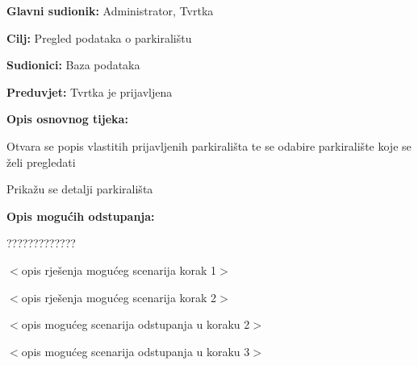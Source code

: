 \noindent {}
\begin{packed_item}
	
	\item \textbf{Glavni sudionik: } Administrator, Tvrtka
	\item  \textbf{Cilj:} Pregled podataka o parkiralištu
	\item  \textbf{Sudionici:} Baza podataka
	\item  \textbf{Preduvjet:} Tvrtka je prijavljena
	\item  \textbf{Opis osnovnog tijeka:}
	
	\item[] \begin{packed_enum}
		
		\item Otvara se popis vlastitih prijavljenih parkirališta te se odabire parkiralište koje se želi pregledati
		\item Prikažu se detalji parkirališta
	
	\end{packed_enum}
	
	\item  \textbf{Opis mogućih odstupanja:}
	
	\item[] \begin{packed_item}
		
		\item[2.a] ?????????????
		\item[] \begin{packed_enum}
			
			\item $<$opis rješenja mogućeg scenarija korak 1$>$
			\item $<$opis rješenja mogućeg scenarija korak 2$>$
			
		\end{packed_enum}
		\item[2.b] $<$opis mogućeg scenarija odstupanja u koraku 2$>$
		\item[3.a] $<$opis mogućeg scenarija odstupanja  u koraku 3$>$
		
	\end{packed_item}
\end{packed_item}


